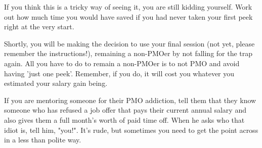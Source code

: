 If you think this is a tricky way of seeing it, you are still kidding yourself. Work out how much time you would have saved if you had never taken your first peek right at the very start.

Shortly, you will be making the decision to use your final session (not yet, please remember the instructions!), remaining a non-PMOer by not falling for the trap again. All you have to do to remain a non-PMOer is to not PMO and avoid having 'just one peek'. Remember, if you do, it will cost you whatever you estimated your salary gain being.

If you are mentoring someone for their PMO addiction, tell them that they know someone who has refused a job offer that pays their current annual salary and also gives them a full month's worth of paid time off. When he asks who that idiot is, tell him, "you!". It's rude, but sometimes you need to get the point across in a less than polite way.
